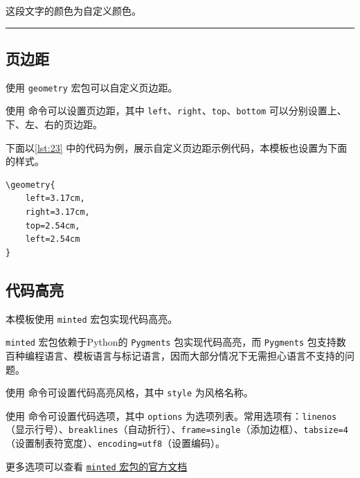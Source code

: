 \documentclass[a4paper]{article}
\begin{document}
\textcolor{mycolor}{这段文字的颜色为自定义颜色。}

\vspace{0.25cm}
\hrule
\vspace{0.25cm}

\subsection{页边距}

使用 \texttt{geometry} 宏包可以自定义页边距。

使用 \texttt{\geometry{left=...,right=...,top=...,bottom=...}} 命令可以设置页边距，其中 \texttt{left}、\texttt{right}、\texttt{top}、\texttt{bottom} 可以分别设置上、下、左、右的页边距。

下面以\cref{lst:23} 中的代码为例，展示自定义页边距示例代码，本模板也设置为下面的样式。

\begin{center}
    \label{lst:23}
    \begin{verbatim}
\geometry{
    left=3.17cm,
    right=3.17cm,
    top=2.54cm,
    left=2.54cm
}
    \end{verbatim}
\end{center}

\subsection{代码高亮}

本模板使用 \texttt{minted} 宏包实现代码高亮。

\texttt{minted} 宏包依赖于Python的 \texttt{Pygments} 包实现代码高亮，而 \texttt{Pygments} 包支持数百种编程语言、模板语言与标记语言，因而大部分情况下无需担心语言不支持的问题。

使用 \texttt{} 命令可设置代码高亮风格，其中 \texttt{style} 为风格名称。

使用 \texttt{} 命令可设置代码选项，其中 \texttt{options} 为选项列表。常用选项有：\texttt{linenos}（显示行号）、\texttt{breaklines}（自动折行）、\texttt{frame=single}（添加边框）、\texttt{tabsize=4}（设置制表符宽度）、\texttt{encoding=utf8}（设置编码）。

更多选项可以查看 \href{https://mirror.math.princeton.edu/pub/CTAN/macros/latex/contrib/minted/minted.pdf}{\texttt{minted} 宏包的官方文档}
\end{document}
